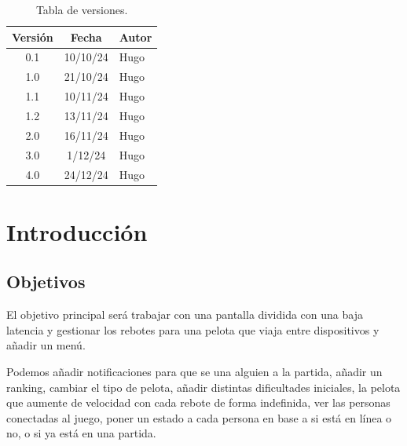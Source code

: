 \documentclass[a4paper,openright,12pt]{article}
\begin{document}

\tableofcontents

\vspace{5cm}

\begin{flushright}
\begin{table}[hbtp]
\begin{center}

\caption{Tabla de versiones.}
\label{tabla:versiones}
\small
\vspace{1ex}

\begin{tabular}{|c|c|l|}
\hline
Versión & Fecha & Autor \\
\hline \hline
0.1 & 10/10/24 & Hugo\\ \hline
1.0 & 21/10/24 & Hugo\\ \hline
1.1 & 10/11/24 & Hugo\\ \hline
1.2 & 13/11/24 & Hugo\\ \hline
2.0 & 16/11/24 & Hugo\\ \hline
3.0 &  1/12/24 & Hugo\\ \hline
4.0 & 24/12/24 & Hugo\\ \hline

\end{tabular}

\end{center}
\end{table}
\end{flushright}

\newpage
{}


\section{Introducción}\label{cap.introduccion}

\subsection{Objetivos}
El objetivo principal será trabajar con una pantalla dividida con una baja latencia y gestionar los rebotes para una pelota que viaja entre dispositivos y añadir un menú.

Podemos añadir notificaciones para que se una alguien a la partida, añadir un ranking, cambiar el tipo de pelota, añadir distintas dificultades iniciales, la pelota que aumente de velocidad con cada rebote de forma indefinida, ver las personas conectadas al juego, poner un estado a cada persona en base a si está en línea o no, o si ya está en una partida.
\end{document}
